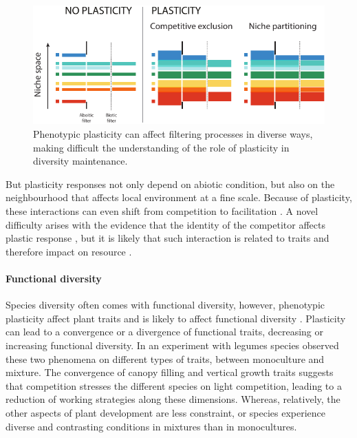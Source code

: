 \begin{figure}
    \includegraphics[width=1\linewidth]{./1_Introduction/graphics/filtering.pdf}
  \caption[Effect of plasticity of filters]{Phenotypic plasticity can affect filtering processes in diverse ways, making difficult the understanding of the role of plasticity in diversity maintenance.}
  \label{fig:plasticity_form}
\end{figure}

But plasticity responses not only depend on abiotic condition, but also on the neighbourhood that affects local environment \parencite{sultan_phenotypic_1995} at a fine scale. Because of plasticity, these interactions can even shift from competition to facilitation \cite{callaway_phenotypic_2003}. A novel difficulty arises with the evidence that the identity of the competitor affects plastic response \parencite{callaway_phenotypic_2003, abakumova_plasticity_2016}, but it is likely that such interaction is related to traits and therefore impact on resource \parencite{callaway_phenotypic_2003}.

\paragraph{Functional diversity}

Species diversity often comes with functional diversity, however, phenotypic plasticity affect plant traits and is likely to affect functional diversity \parencite{albert_importance_2012}. Plasticity can lead to a convergence or a divergence of functional traits, decreasing or increasing functional diversity. In an experiment with legumes species \cite{roscher_contrasting_2015} observed these two phenomena on different types of traits, between monoculture and mixture. The convergence of canopy filling and vertical growth traits suggests that competition stresses the different species on light competition, leading to a reduction of working strategies along these dimensions. Whereas, relatively, the other aspects of plant development are less constraint, or species experience diverse and contrasting conditions in mixtures than in monocultures.



